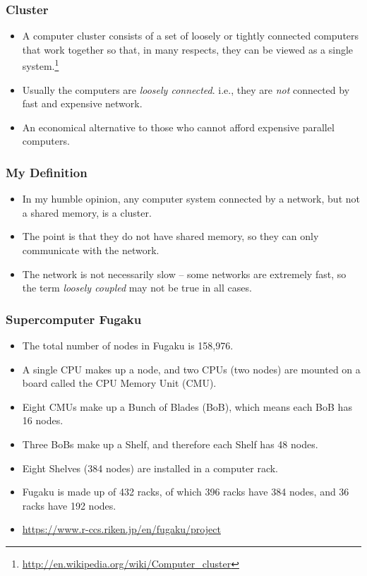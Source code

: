 \documentclass{beamer}
\begin{document}
\begin{CJK}{UTF8}{bsmi}
  \begin{frame}
    \frametitle{Cluster}
    \begin{itemize}
    \item A computer cluster consists of a set of loosely or tightly
      connected computers that work together so that, in many respects,
      they can be viewed as a single
      system.\footnote{\url{http://en.wikipedia.org/wiki/Computer_cluster}}
    \item Usually the computers are {\em loosely connected}. i.e., they
      are {\em not} connected by fast and expensive network.
    \item An economical alternative to those who cannot afford expensive
      parallel computers.
    \end{itemize}
  \end{frame}

  \begin{frame}
    \frametitle{My Definition}
    \begin{itemize}
    \item In my humble opinion, any computer system connected by a network, but not a shared memory, is a cluster.
    \item The point is that they do not have shared memory, so they can only communicate with the network.
    \item The network is not necessarily slow -- some networks are extremely fast, so the term {\em loosely coupled} may not be true in all cases.
    \end{itemize}
  \end{frame}

  \begin{frame}
    \frametitle{Supercomputer Fugaku}
    \begin{itemize}
    \item The total number of nodes in Fugaku is 158,976.
    \item A single CPU makes up a node, and two CPUs (two nodes) are
      mounted on a board called the CPU Memory Unit (CMU).
    \item Eight CMUs make up a Bunch of Blades (BoB), which means each BoB
      has 16 nodes.
    \item Three BoBs make up a Shelf, and therefore each Shelf has 48 nodes.
    \item Eight Shelves (384 nodes) are installed in a computer rack.
    \item Fugaku is made up of 432 racks, of which 396 racks have 384 nodes, and 36 racks have 192 nodes.
    \item \url{https://www.r-ccs.riken.jp/en/fugaku/project}
    \end{itemize}
  \end{frame}


\end{CJK}
\end{document}
